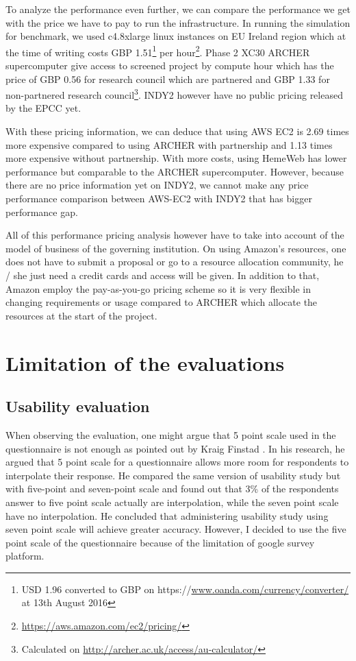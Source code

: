 To analyze the performance even further, we can compare the performance we get with the price we have to pay to run the infrastructure. In running the simulation for benchmark, we used c4.8xlarge linux instances on EU Ireland region which at the time of writing costs GBP 1.51\footnote{USD 1.96 converted to GBP on https://\url{www.oanda.com/currency/converter/} at 13th August 2016} per hour\footnote{\url{https://aws.amazon.com/ec2/pricing/}}. Phase 2 XC30 ARCHER supercomputer give access to screened project by compute hour which has the price of GBP 0.56 for research council which are partnered and GBP 1.33 for  non-partnered research council\footnote{Calculated on \url{http://archer.ac.uk/access/au-calculator/}}. INDY2 however have no public pricing released by the EPCC yet.

With these pricing information, we can deduce that using AWS EC2 is 2.69 times more expensive compared to using ARCHER with partnership and 1.13 times more expensive without partnership. With more costs, using HemeWeb has lower performance but comparable to the ARCHER supercomputer.  However, because there are no price information yet on INDY2, we cannot make any price performance comparison between AWS-EC2 with INDY2 that has bigger performance gap.

All of this performance pricing analysis however have to take into account of the model of business of the governing institution. On using Amazon's resources, one does not have to submit a proposal or go to a resource allocation community, he / she just need a credit cards and access will be given. In addition to that, Amazon employ the pay-as-you-go pricing scheme so it is very flexible in changing requirements or usage compared to ARCHER which allocate the resources at the start of the project. 


\section {Limitation of the evaluations}

\subsection{Usability evaluation}

When observing the evaluation, one might argue that 5 point scale used in the questionnaire is not enough as pointed out by Kraig Finstad \cite{finstad2010response}. In his research, he argued that 5 point scale for a questionnaire allows more room for respondents to interpolate their response. He compared the same version of usability study but with five-point and seven-point scale and found out that 3\% of the respondents answer to five point scale actually are interpolation, while the seven point scale have no interpolation. He concluded that administering usability study using seven point scale will achieve greater accuracy. However, I decided to use the five point scale of the questionnaire because of the limitation of google survey platform. 

